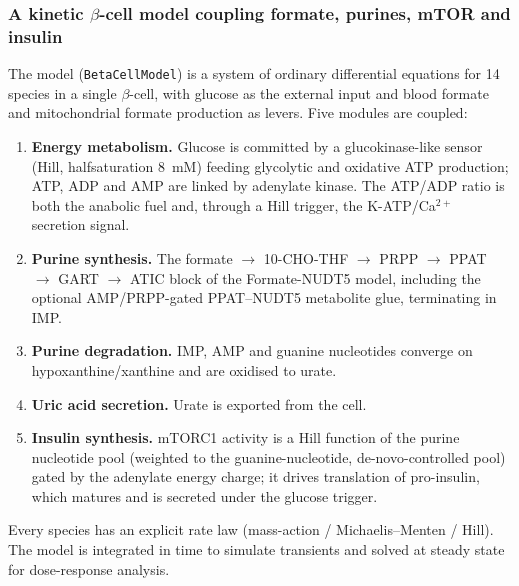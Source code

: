 \documentclass[10pt,letterpaper]{article}
\begin{document}
\subsubsection*{A kinetic $\beta$-cell model coupling formate, purines, mTOR and
insulin}
The model (\texttt{BetaCellModel}) is a system of ordinary differential
equations for 14 species in a single $\beta$-cell, with glucose as the external
input and blood formate and mitochondrial formate production as levers. Five
modules are coupled:
\begin{enumerate}\itemsep2pt
  \item \textbf{Energy metabolism.} Glucose is committed by a glucokinase-like
  sensor (Hill, half\-satu\-ra\-tion 8~mM) feeding glycolytic and oxidative ATP
  production; ATP, ADP and AMP are linked by adenylate kinase. The ATP/\allowbreak ADP ratio
  is both the anabolic fuel and, through a Hill trigger, the K-ATP/\allowbreak Ca$^{2+}$
  secretion signal.
  \item \textbf{Purine synthesis.} The formate $\rightarrow$ 10-CHO-THF
  $\rightarrow$ PRPP $\rightarrow$ PPAT $\rightarrow$ GART $\rightarrow$ ATIC
  block of the Formate-NUDT5 model, including the optional AMP/PRPP-gated
  PPAT--NUDT5 metabolite glue, terminating in IMP.
  \item \textbf{Purine degradation.} IMP, AMP and guanine nucleotides converge
  on hypoxanthine/\allowbreak xanthine and are oxidised to urate.
  \item \textbf{Uric acid secretion.} Urate is exported from the cell.
  \item \textbf{Insulin synthesis.} mTORC1 activity is a Hill function of the
  purine nucleotide pool (weighted to the guanine-nucleotide,
  de-novo-controlled pool) gated by the adenylate energy charge; it drives
  translation of pro-insulin, which matures and is secreted under the glucose
  trigger.
\end{enumerate}
Every species has an explicit rate law (mass-action / Michaelis--Menten / Hill).
The model is integrated in time to simulate transients and solved at steady
state for dose-response analysis.
\end{document}
